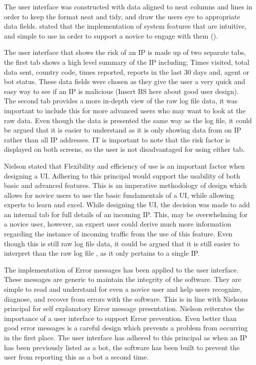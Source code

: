 The user interface was constructed with data aligned to neat columns and lines in order to keep the format neat and tidy, and draw the users eye to appropriate data fields. \citeauthor{cranor2008framework} stated that the implementation of system features that are intuitive, and simple to use in order to support a novice to engage with them (\cite{cranor2008framework}).

The user interface that shows the risk of an IP is made up of two separate tabs, the first tab shows a high level summary of the IP including; Times visited, total data sent, country code, times reported, reports in the last 30 days and, agent or bot status. These data fields were chosen as they give the user a very quick and easy way to see if an IP is malicious (Insert BS here about good user design). The second tab provides a more in-depth view of the raw log file data, it was important to include this for more advanced users who may want to look at the raw data. Even though the data is presented the same way as the log file, it could be argued that it is easier to understand as it is only showing data from on IP rather than all IP addresses. IT is important to note that the risk factor is displayed on both screens, so the user is not disadvantaged for using either tab.

Nielson stated that Flexibility and efficiency of use is an important factor when designing a UI. Adhering to this principal would support the usability of both basic and advanced features. This is an imperative methodology of design which allows for novice users to use the basic fundamentals of a UI, while allowing experts to learn and excel. While designing the UI, the decision was made to add an internal tab for full details of an incoming IP. This, may be overwhelming for a novice user, however, an expert user could derive much more information regarding the instance of incoming traffic from the use of this feature. Even though this is still raw log file data, it could be argued that it is still easier to interpret than the raw log file , as it only pertains to a single IP.


The implementation of Error messages has been applied to the user interface. These messages are generic to maintain the integrity of the software. They are simple to read and understand for even a novice user and help users recognize, diagnose, and recover from errors with the software. This is in line with Nielsons principal for self explanatory Error message presentation. Nielson reiterates the importance of a user interface to support Error prevention. Even better than good error messages is a careful design which prevents a problem from occurring in the first place. The user interface has adhered to this principal as when an IP has been previously listed as a bot, the software has been built to prevent the user from reporting this as a bot a second time.

